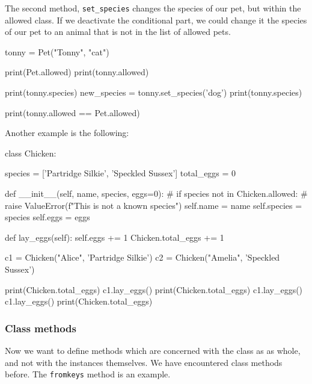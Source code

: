The second method, \verb|set_species| changes the species of our pet, but within the allowed class. If we deactivate the conditional part, we could change it the species of our pet to an animal that is not in the list of allowed pets. 

\begin{listingcont}
tonny = Pet("Tonny", "cat")

print(Pet.allowed)
print(tonny.allowed)

print(tonny.species)
new_species = tonny.set_species('dog')
print(tonny.species)

print(tonny.allowed == Pet.allowed)	
\end{listingcont}

Another example is the following:
\begin{listing}{1}
class Chicken:

    species = ['Partridge Silkie', 'Speckled Sussex']
    total_eggs = 0

    def __init__(self, name, species, eggs=0):
        # if species not in Chicken.allowed:
        #     raise ValueError(f"This is not a known {species}")
        self.name = name
        self.species = species
        self.eggs = eggs

    def lay_eggs(self):
        self.eggs += 1
        Chicken.total_eggs += 1

c1 = Chicken("Alice", 'Partridge Silkie')
c2 = Chicken("Amelia", 'Speckled Sussex') 

print(Chicken.total_eggs)
c1.lay_eggs()
print(Chicken.total_eggs)
c1.lay_eggs()
c1.lay_eggs()
print(Chicken.total_eggs)	
\end{listing}


\subsubsection{Class methods}

Now we want to define methods which are concerned with the class as as whole, and not with the instances themselves. We have encountered class methods before. The \verb|fromkeys| method is an example. 

